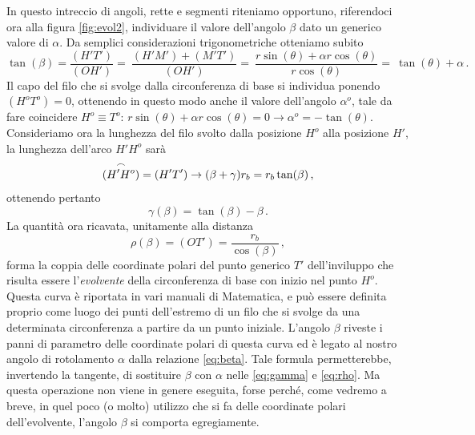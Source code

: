 \noindent In questo intreccio di angoli, rette e segmenti riteniamo opportuno,
riferendoci ora alla figura \ref{fig:evol2},
individuare il valore dell'angolo $\beta$ dato un generico valore di $\alpha$.
Da semplici considerazioni trigonometriche otteniamo subito
\begin{equation}
\tan(\beta) = \frac{(H'T')}{(OH')}=\
\frac{(H'M')+(M'T')}{(OH')}=\
\frac{r\sin(\theta)+\alpha  r\cos(\theta)}{r\cos(\theta)}=\
\tan(\theta) + \alpha\,.
\label{eq:beta}
\end{equation}
\vskip 1mm
\noindent Il capo del filo che si svolge dalla circonferenza di base
si individua ponendo $(H^oT^o)=0$, ottenendo in questo modo anche
il valore dell'angolo $\alpha^o$,
tale da fare coincidere $H^o\equiv T^o$:
$r\sin(\theta)+\alpha  r\cos(\theta) = 0 \rightarrow \alpha^o= -\tan(\theta)$.
Consideriamo ora la lunghezza del filo svolto dalla posizione $H^o$ alla
posizione $H'$, la lunghezza dell'arco $H'H^o$ sar\`a
\begin{equation}
\overset{\large\frown}{(H'H^o)} = (H'T') \rightarrow (\beta + \gamma) r_b= r_b \tan(\beta)\,,
\label{eq:gamma0}
\end{equation}
\noindent ottenendo pertanto
\begin{equation}
 \gamma(\beta) = \tan(\beta)-\beta \,.
\label{eq:gamma}
\end{equation}
\noindent La quantit\`a ora ricavata, unitamente alla distanza
\begin{equation}
\rho(\beta) = (OT') =  \frac{r_b}{\cos(\beta)}\,,
\label{eq:rho}
\end{equation}
\noindent forma la coppia delle coordinate polari del  punto generico
 $T'$ dell'inviluppo
che risulta essere l'{\em evolvente}
 della circonferenza di base con inizio
nel punto $H^o$. Questa curva \`e riportata in vari manuali di Matematica,
e pu\`o essere definita proprio come luogo dei punti dell'estremo di un filo
che si svolge da una determinata circonferenza a partire da un punto iniziale.
L'angolo $\beta$ riveste i panni di
parametro delle
coordinate polari di questa curva ed \`e
legato al nostro angolo di rotolamento
$\alpha$ dalla relazione \ref{eq:beta}. Tale formula permetterebbe,
invertendo la tangente, di sostituire $\beta$ con $\alpha$ nelle
\ref{eq:gamma} e \ref{eq:rho}.
Ma questa operazione
non viene in genere eseguita, forse perch\'e, come vedremo a breve,
in quel poco (o molto) utilizzo che si fa delle coordinate polari dell'evolvente,
l'angolo $\beta$ si comporta egregiamente.

